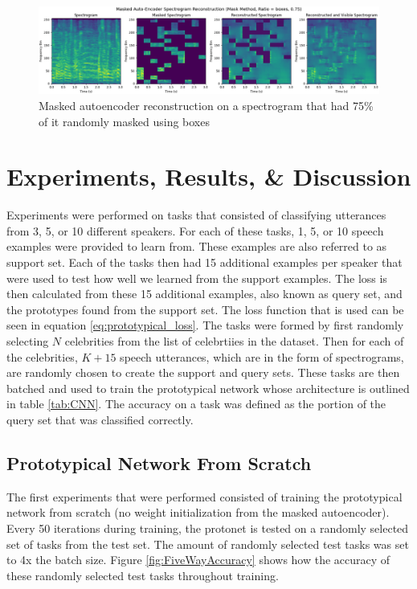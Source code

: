 \documentclass{article}
\begin{document}
\begin{figure}
  \centering
  \includegraphics[width=1.0\textwidth]{Images/mae_mask_boxes_mask_ratio_75_lr_005_batch_64.png}
  \caption{Masked autoencoder reconstruction on a spectrogram that had 75\% of it randomly masked using boxes}
  \label{fig:MAEBoxes}
\end{figure}

\section{Experiments, Results, \& Discussion}
Experiments were performed on tasks that consisted of classifying utterances from 3, 5, or 10 different speakers. For
each of these tasks, 1, 5, or 10 speech examples were provided to learn from. These examples are also referred to as support set. Each
of the tasks then had 15 additional examples per speaker that were used to test how well we learned from the support 
examples. The loss is then calculated from these 15 additional examples, also known as query set, and the prototypes found from the support set.
The loss function that is used can be seen in equation \ref{eq:prototypical_loss}. The tasks were formed by first randomly selecting $N$ celebrities
from the list of celebrtiies in the dataset. Then for each of the celebrities, $K + 15$ speech utterances, which are in the form
of spectrograms, are randomly chosen to create the support and query sets. These tasks are then batched and used to train
the prototypical network whose architecture is outlined in table \ref{tab:CNN}. The accuracy on a task was defined as the
portion of the query set that was classified correctly. 

\subsection{Prototypical Network From Scratch}
The first experiments that were performed consisted of training the prototypical network from scratch (no weight initialization
from the masked autoencoder). Every 50 iterations during training, the protonet is tested on a randomly selected set of tasks from the 
test set. The amount of randomly selected test tasks was set to 4x the batch size. Figure \ref{fig:FiveWayAccuracy} shows
how the accuracy of these randomly selected test tasks throughout training.
\end{document}
